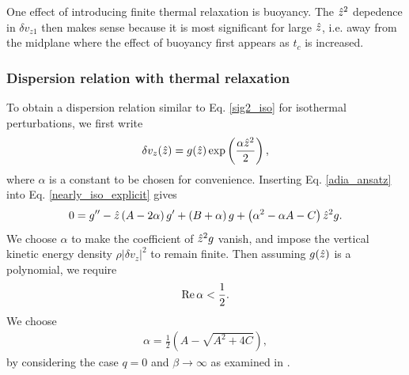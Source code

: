 One effect of introducing finite thermal relaxation is buoyancy. 
The $\hat{z}^2$ depedence in $\delta v_{z1}$ then makes sense because it
is most significant for large $\hat{z}$, i.e. away from the midplane
where the effect of buoyancy first appears as $t_c$ is increased. 

\subsubsection{Dispersion relation with thermal
  relaxation}\label{disp_relax}
To obtain a dispersion relation similar to Eq. \ref{sig2_iso} for
isothermal perturbations, we first write 
\begin{align}
  \delta v_z(\hat{z}) =
  g(\hat{z})\exp\left(\frac{\alpha\hat{z}^2}{2}\right), \label{adia_ansatz}
\end{align}
where $\alpha$ is a constant to be chosen for convenience. Inserting
Eq. \ref{adia_ansatz} into Eq. \ref{nearly_iso_explicit} gives
\begin{align}
  0 = g^{\prime\prime} - \hat{z}\left(A - 2\alpha\right)g^\prime + \left(B +
    \alpha\right)g
  +\left(\alpha^2 - \alpha A - C\right)\hat{z}^2 g.
\end{align}
We choose $\alpha$ to make the coefficient of $\hat{z}^2g$
vanish, and impose the vertical kinetic energy density
$\rho|\delta v_z|^2$ to remain finite. Then assuming $g(\hat{z})$ is a
polynomial, we require  
\begin{align}
  \operatorname{Re}\alpha < \frac{1}{2}. 
\end{align}
We choose 
\begin{align}
  \alpha = \frac{1}{2}\left(A - \sqrt{A^2 + 4C}\right),  
\end{align} 
by considering the case $q=0$ and $\beta\to\infty$ as examined in
\cite{lubow93}.   

